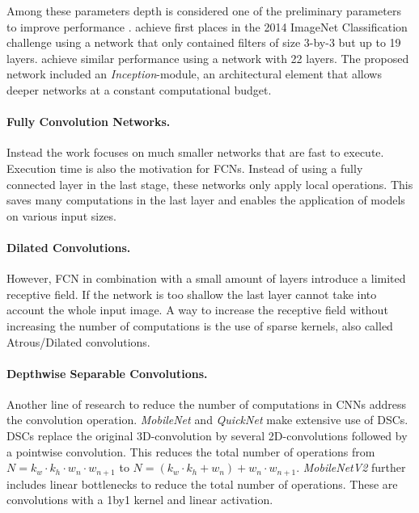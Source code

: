 Among these parameters depth is considered one of the preliminary parameters to improve performance \cite{He}. \citeauthor{Simonyan2014} \cite{Simonyan2014} achieve first places in the 2014 ImageNet Classification challenge using a network that only contained filters of size 3-by-3 but up to 19 layers. \citeauthor{Szegedy2014} \cite{Szegedy2014} achieve similar performance using a network with 22 layers. The proposed network included an \textit{Inception}-module, an architectural element that allows deeper networks at a constant computational budget. 


\paragraph{Fully Convolution Networks.}

Instead the work focuses on much smaller networks that are fast to execute. Execution time is also the motivation for \acp{FCN}. Instead of using a fully connected layer in the last stage, these networks only apply local operations. This saves many computations in the last layer and enables the application of models on various input sizes.

\paragraph{Dilated Convolutions.}

However, \ac{FCN} in combination with a small amount of layers introduce a limited receptive field. If the network is too shallow the last layer cannot take into account the whole input image. A way to increase the receptive field without increasing the number of computations is the use of sparse kernels, also called Atrous/Dilated convolutions. 

\paragraph{Depthwise Separable Convolutions.}

Another line of research to reduce the number of computations in \acp{CNN} address the convolution operation. \textit{MobileNet} \cite{Howard2017} and \textit{QuickNet} \cite{Ghosh2017} make extensive use of \acp{DSC}. \acp{DSC} replace the original 3D-convolution by several 2D-convolutions followed by a pointwise convolution. This reduces the total number of operations from $N = k_w \cdot k_h \cdot w_n \cdot w_{n+1}$ to $N=(k_w \cdot k_h + w_n)+w_n \cdot w_{n+1}$. \textit{MobileNetV2} \cite{Sandler2018} further includes linear bottlenecks to reduce the total number of operations. These are convolutions with a 1by1 kernel and linear activation.

